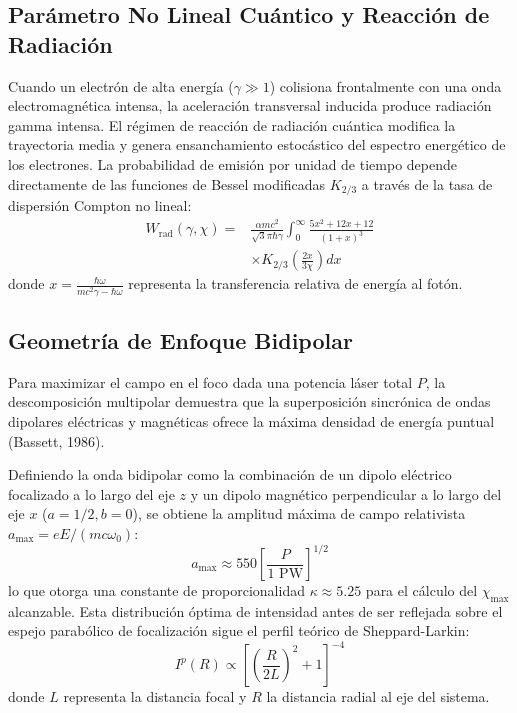 \documentclass[twocolumn, 12pt]{article}
\begin{document}
\subsection{Parámetro No Lineal Cuántico y Reacción de Radiación}
Cuando un electrón de alta energía ($\gamma \gg 1$) colisiona frontalmente con una onda electromagnética intensa, la aceleración transversal inducida produce radiación gamma intensa. El régimen de reacción de radiación cuántica modifica la trayectoria media y genera ensanchamiento estocástico del espectro energético de los electrones. La probabilidad de emisión por unidad de tiempo depende directamente de las funciones de Bessel modificadas $K_{2/3}$ a través de la tasa de dispersión Compton no lineal:
\begin{equation}
\begin{split}
W_{\text{rad}}(\gamma, \chi) = & \frac{\alpha m c^2}{\sqrt{3} \pi \hbar \gamma} \int_0^\infty \frac{5x^2 + 12x + 12}{(1+x)^3} \\
& \times K_{2/3}\left(\frac{2x}{3\chi}\right) dx
\end{split}
\end{equation}
donde $x = \frac{\hbar \omega}{m c^2 \gamma - \hbar \omega}$ representa la transferencia relativa de energía al fotón.

\subsection{Geometría de Enfoque Bidipolar}
Para maximizar el campo en el foco dada una potencia láser total $P$, la descomposición multipolar demuestra que la superposición sincrónica de ondas dipolares eléctricas y magnéticas ofrece la máxima densidad de energía puntual (Bassett, 1986).

Definiendo la onda bidipolar como la combinación de un dipolo eléctrico focalizado a lo largo del eje $z$ y un dipolo magnético perpendicular a lo largo del eje $x$ ($a=1/2, b=0$), se obtiene la amplitud máxima de campo relativista $a_{\text{max}} = e E / (m c \omega_0)$:
\begin{equation}
a_{\text{max}} \approx 550 \left[ \frac{P}{1 \text{ PW}} \right]^{1/2}
\end{equation}
lo que otorga una constante de proporcionalidad $\kappa \approx 5.25$ para el cálculo del $\chi_{\text{max}}$ alcanzable. Esta distribución óptima de intensidad antes de ser reflejada sobre el espejo parabólico de focalización sigue el perfil teórico de Sheppard-Larkin:
\begin{equation}
I^p(R) \propto \left[ \left(\frac{R}{2L}\right)^2 + 1 \right]^{-4}
\label{eq:sheppard}
\end{equation}
donde $L$ representa la distancia focal y $R$ la distancia radial al eje del sistema.
\end{document}
